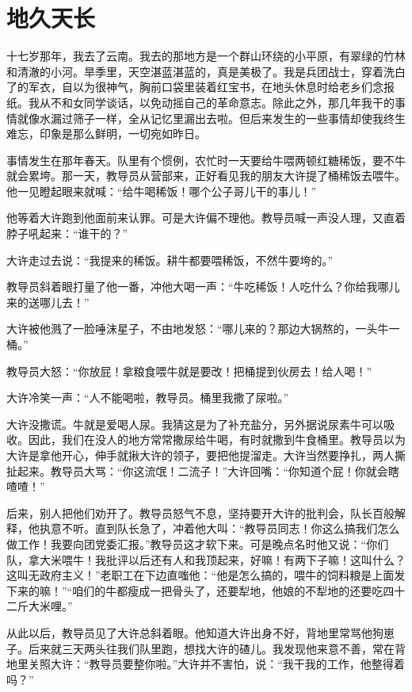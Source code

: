 \chapter{地久天长}

十七岁那年，我去了云南。我去的那地方是一个群山环绕的小平原，有翠绿的竹林和清澈的小河。旱季里，天空湛蓝湛蓝的，真是美极了。我是兵团战士，穿着洗白了的军衣，自以为很神气，胸前口袋里装着红宝书，在地头休息时给老乡们念报纸。我从不和女同学谈话，以免动摇自己的革命意志。除此之外，那几年我干的事情就像水漏过筛子一样，全从记忆里漏出去啦。但后来发生的一些事情却使我终生难忘，印象是那么鲜明，一切宛如昨日。 

事情发生在那年春天。队里有个惯例，农忙时一天要给牛喂两顿红糖稀饭，要不牛就会累垮。那一天，教导员从营部来，正好看见我的朋友大许提了桶稀饭去喂牛。他一见瞪起眼来就喊：“给牛喝稀饭！哪个公子哥儿干的事儿！” 

他等着大许跑到他面前来认罪。可是大许偏不理他。教导员喊一声没人理，又直着脖子吼起来：“谁干的？” 

大许走过去说：“我提来的稀饭。耕牛都要喂稀饭，不然牛要垮的。” 

教导员斜着眼打量了他一番，冲他大喝一声：“牛吃稀饭！人吃什么？你给我哪儿来的送哪儿去！” 

大许被他溅了一脸唾沫星子，不由地发怒：“哪儿来的？那边大锅熬的，一头牛一桶。” 

教导员大怒：“你放屁！拿粮食喂牛就是要改！把桶提到伙房去！给人喝！” 

大许冷笑一声：“人不能喝啦，教导员。桶里我撒了尿啦。” 

大许没撒谎。牛就是爱喝人尿。我猜这是为了补充盐分，另外据说尿素牛可以吸收。因此，我们在没人的地方常常撒尿给牛喝，有时就撒到牛食桶里。教导员以为大许是拿他开心，伸手就揪大许的领子，要把他提溜走。大许当然要挣扎，两人撕扯起来。教导员大骂：“你这流氓！二流子！”大许回嘴：“你知道个屁！你就会瞎喳喳！” 

后来，别人把他们劝开了。教导员怒气不息，坚持要开大许的批判会，队长百般解释，他执意不听。直到队长急了，冲着他大叫：“教导员同志！你这么搞我们怎么做工作！我要向团党委汇报。”教导员这才软下来。可是晚点名时他又说：“你们队，拿大米喂牛！我批评以后还有人和我顶起来，好嘛！有两下子嘛！这叫什么？这叫无政府主义！”老职工在下边直嗤他：“他是怎么搞的，喂牛的饲料粮是上面发下来的嘛！”“咱们的牛都瘦成一把骨头了，还要犁地，他娘的不犁地的还要吃四十二斤大米哩。” 

从此以后，教导员见了大许总斜着眼。他知道大许出身不好，背地里常骂他狗崽子。后来就三天两头往我们队里跑，想找大许的碴儿。我发现他来意不善，常在背地里关照大许：“教导员要整你啦。”大许并不害怕，说：“我干我的工作，他整得着吗？” 

